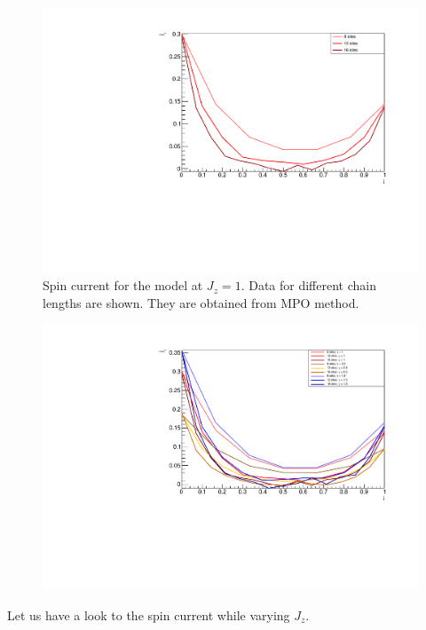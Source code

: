 \begin{figure}[H]
    \centering
    \includegraphics[scale=0.7]{Figures/NORM_SpinCurr_comparisonVSsize.pdf}
    \caption{Spin current for the model at $J_z = 1$. Data for different chain lengths are shown. They are obtained from MPO method.}
    \label{fig:my_label}
\end{figure}

\begin{figure}[H]
    \centering
    \includegraphics[scale=0.7]{Figures/SpinCurrcomparisonVSsizeANDdissipationRate.pdf}
    \caption{}
    \label{fig:my_label}
\end{figure}

Let us have a look to the spin current while varying $J_z$.

